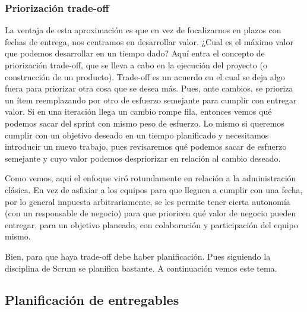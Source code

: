 \subsubsection{Priorización trade-off}

La ventaja de esta aproximación es que en vez de focalizarnos en plazos con fechas de entrega, nos centramos en desarrollar valor. ¿Cual es el máximo valor que podemos desarrollar en un tiempo dado? Aquí entra el concepto de priorización trade-off, que se lleva a cabo en la ejecución del proyecto (o construcción de un producto). Trade-off es un acuerdo en el cual se deja algo fuera para priorizar otra cosa que se desea más. Pues, ante cambios, se prioriza un ítem reemplazando por otro de esfuerzo semejante para cumplir con entregar valor. Si en una iteración llega un cambio rompe fila, entonces vemos qué podemos sacar del sprint con mismo peso de esfuerzo. Lo mismo si queremos cumplir con un objetivo deseado en un tiempo planificado y necesitamos introducir un nuevo trabajo, pues revisaremos qué podemos sacar de esfuerzo semejante y cuyo valor podemos despriorizar en relación al cambio deseado.

Como vemos, aquí el enfoque viró rotundamente en relación a la administración clásica. En vez de asfixiar a los equipos para que lleguen a cumplir con una fecha, por lo general impuesta arbitrariamente, se les permite tener cierta autonomía (con un responsable de negocio) para que prioricen qué valor de negocio pueden entregar, para un objetivo planeado, con colaboración y participación del equipo mismo.

Bien, para que haya trade-off debe haber planificación. Pues siguiendo la disciplina de Scrum se planifica bastante. A continuación vemos este tema.


\subsection{Planificación de entregables}

